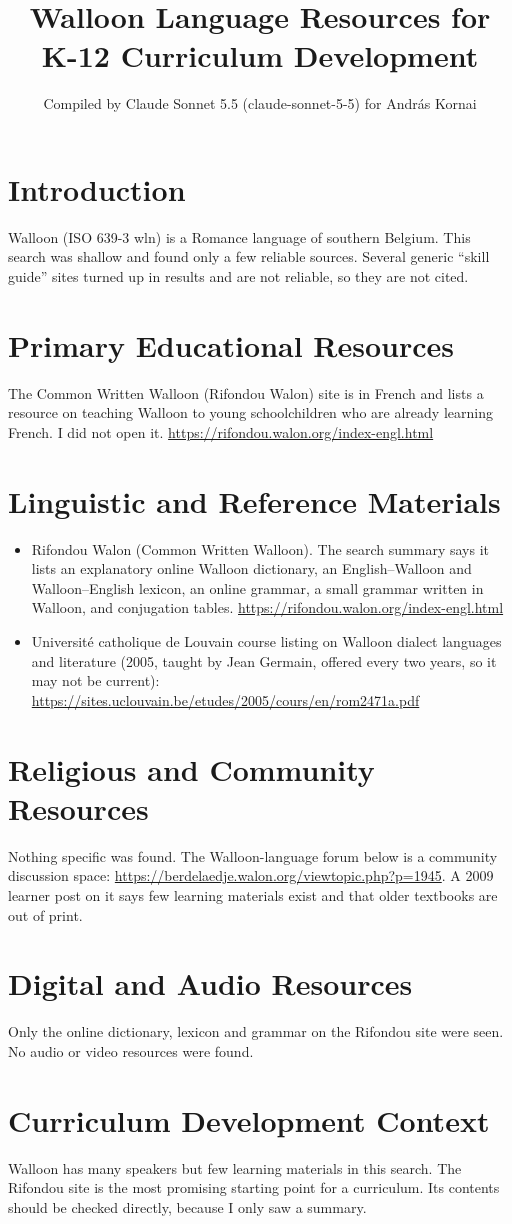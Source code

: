 \documentclass[12pt]{article}
\title{Walloon Language Resources for K-12 Curriculum Development}
\author{Compiled by Claude Sonnet 5.5 (claude-sonnet-5-5) for Andr\'as Kornai}
\date{}
\begin{document}
\maketitle

\section{Introduction}
Walloon (ISO 639-3 wln) is a Romance language of southern Belgium. This search was shallow and found only a few reliable sources. Several generic ``skill guide'' sites turned up in results and are not reliable, so they are not cited.

\section{Primary Educational Resources}
The Common Written Walloon (Rifondou Walon) site is in French and lists a resource on teaching Walloon to young schoolchildren who are already learning French. I did not open it. \url{https://rifondou.walon.org/index-engl.html}

\section{Linguistic and Reference Materials}
\begin{itemize}
\item Rifondou Walon (Common Written Walloon). The search summary says it lists an explanatory online Walloon dictionary, an English--Walloon and Walloon--English lexicon, an online grammar, a small grammar written in Walloon, and conjugation tables. \url{https://rifondou.walon.org/index-engl.html}
\item Universit\'e catholique de Louvain course listing on Walloon dialect languages and literature (2005, taught by Jean Germain, offered every two years, so it may not be current): \url{https://sites.uclouvain.be/etudes/2005/cours/en/rom2471a.pdf}
\end{itemize}

\section{Religious and Community Resources}
Nothing specific was found. The Walloon-language forum below is a community discussion space: \url{https://berdelaedje.walon.org/viewtopic.php?p=1945}. A 2009 learner post on it says few learning materials exist and that older textbooks are out of print.

\section{Digital and Audio Resources}
Only the online dictionary, lexicon and grammar on the Rifondou site were seen. No audio or video resources were found.

\section{Curriculum Development Context}
Walloon has many speakers but few learning materials in this search. The Rifondou site is the most promising starting point for a curriculum. Its contents should be checked directly, because I only saw a summary.
\end{document}
